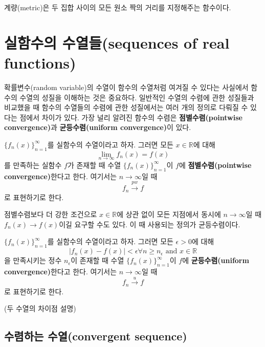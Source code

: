 \documentclass[b5paper,]{scrbook}
\theoremstyle{plain}
\theoremstyle{definition}
\numberwithin{equation}{section}
\let\BeginKnitrBlock\begin \let\EndKnitrBlock\end
\begin{document}
계량(metric)은 두 집합 사이의 모든 원소 짝의 거리를 지정해주는 함수이다.

\section{실함수의 수열들(sequences of real
functions)}\label{-sequences-of-real-functions}

확률변수(random variable)의 수열이 함수의 수열처럼 여겨질 수 있다는
사실에서 함수의 수열의 성질을 이해하는 것은 중요하다. 일반적인 수열의
수렴에 관한 성질들과 비교했을 때 함수의 수열들의 수렴에 관한 성질에서는
여러 개의 정의로 다뤄질 수 있다는 점에서 차이가 있다. 가장 널리 알려진
함수의 수렴은 \textbf{점별수렴(pointwise convergence)}과
\textbf{균등수렴(uniform convergence)}이 있다.

\BeginKnitrBlock{definition}[점별수렴]
\protect\hypertarget{def:unnamed-chunk-26}{}{\label{def:unnamed-chunk-26}
{} }\(\{ f_{n}(x)\}_{n=1}^{\infty}\)를 실함수의
수열이라고 하자. 그러면 모든 \(x\in\mathbb{R}\)에 대해
\[\lim_{n\rightarrow \infty}f_{n}(x)=f(x)\] 를 만족하는 실함수 \(f\)가
존재할 때 수열 \(\{ f_{n}(x)\}_{n=1}^{\infty}\)이 \(f\)에
\textbf{점별수렴(pointwise convergence)}한다고 한다. 여기서는
\(n\rightarrow \infty\)일 때 \[f_{n} \stackrel{pw}{\rightarrow} f\] 로
표현하기로 한다.
\EndKnitrBlock{definition}

점별수렴보다 더 강한 조건으로 \(x \in \mathbb{R}\)에 상관 없이 모든
지점에서 동시에 \(n\rightarrow\infty\)일 때
\(f_{n}(x) \rightarrow f(x)\)이길 요구할 수도 있다. 이 때 사용되는
정의가 균등수렴이다.

\BeginKnitrBlock{definition}[균등수렴]
\protect\hypertarget{def:unnamed-chunk-27}{}{\label{def:unnamed-chunk-27}
{} }\(\{ f_{n}(x)\}_{n=1}^{\infty}\)를 실함수의
수열이라고 하자. 그러면 모든 \(\epsilon > 0\)에 대해
\[|f_{n}(x)-f(x)| <\epsilon \forall n \geq n_{\epsilon} \text{ and } x\in \mathbb{R}\]
을 만족시키는 정수 \(n_{\epsilon}\)이 존재할 때 수열
\(\{ f_{n}(x)\}_{n=1}^{\infty}\)이 \(f\)에 \textbf{균등수렴(uniform
convergence)}한다고 한다. 여기서는 \(n\rightarrow \infty\)일 때
\[f_{n} \stackrel{u}{\rightarrow} f\] 로 표현하기로 한다.
\EndKnitrBlock{definition}

(두 수열의 차이점 설명)

\subsection{수렴하는 수열(convergent
sequence)}\label{-convergent-sequence}
\end{document}
